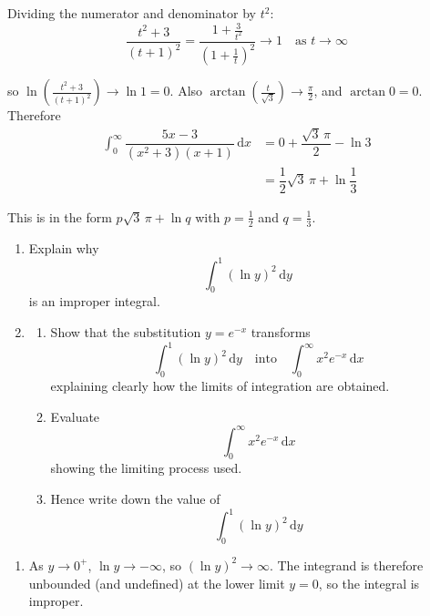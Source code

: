 \documentclass[leqno]{article}
\begin{document}
\begin{enumerate}[
  label=\textbf{\arabic*.},
  leftmargin=*,
  topsep=0pt,
  partopsep=0pt,
  parsep=0pt
]
\begin{djsSolution}
Dividing the numerator and denominator by \(t^2\):
\[
\dfrac{t^2+3}{(t+1)^2}=\dfrac{1+\frac{3}{t^2}}{\left(1+\frac{1}{t}\right)^2}\to 1\quad\text{as } t\to\infty
\]

so \(\ln\left(\frac{t^2+3}{(t+1)^2}\right)\to\ln 1=0\). Also \(\arctan\left(\frac{t}{\sqrt{3}}\right)\to\frac{\pi}{2}\), and \(\arctan 0=0\). Therefore
\begin{align*}
\int_0^{\infty}\dfrac{5x-3}{(x^2+3)(x+1)}\,\mathrm{d}x&=0+\dfrac{\sqrt{3}\,\pi}{2}-\ln 3\\
&=\dfrac{1}{2}\sqrt{3}\,\pi+\ln\dfrac{1}{3}
\end{align*}

This is in the form \(p\sqrt{3}\,\pi+\ln q\) with \(p=\frac{1}{2}\) and \(q=\frac{1}{3}\).
\end{djsSolution}

\newpage

\questionitem

\begin{enumerate}[label=\textbf{(\alph*)}]
  \item Explain why
  \[\int_{0}^{1} (\ln y)^2\,\mathrm{d}y\]
  is an improper integral.  \\
  \item
  \begin{enumerate}[label=(\roman*)]
    \item Show that the substitution $y = e^{-x}$ transforms
    \[\int_{0}^{1} (\ln y)^2\,\mathrm{d}y \quad \text{into} \quad \int_{0}^{\infty} x^2 e^{-x}\,\mathrm{d}x\]
    explaining clearly how the limits of integration are obtained.  \\
    \item Evaluate
    \[\int_{0}^{\infty} x^2 e^{-x}\,\mathrm{d}x\]
    showing the limiting process used.  \\
    \item Hence write down the value of
    \[\int_{0}^{1} (\ln y)^2\,\mathrm{d}y\] 
  \end{enumerate}
\end{enumerate}

\vspace*{10pt}

\begin{djsSolution}
\begin{enumerate}[label=\textbf{(\alph*)}, start=1]
  \item As \(y \to 0^{+}\), \(\ln y \to -\infty\), so \((\ln y)^2 \to \infty\). The integrand is therefore unbounded (and undefined) at the lower limit \(y=0\), so the integral is improper.


\end{enumerate}
\end{djsSolution}
\end{enumerate}
\end{document}
